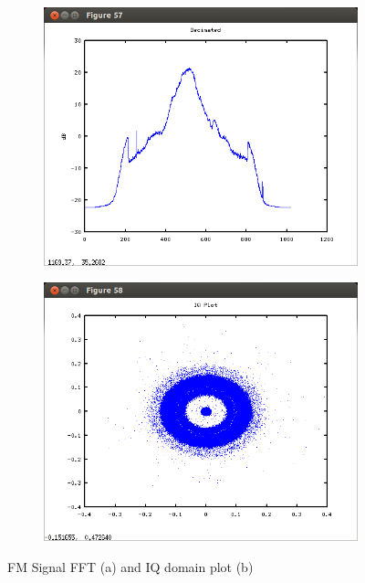 \begin{figure}
\centering
\begin{subfigure}{.49\textwidth}
\centering
\includegraphics[width=\linewidth]{../img/Report_Decimated_FM_Signal.png}
\caption{ }
\end{subfigure}
\begin{subfigure}{.49\textwidth}
\centering
\includegraphics[width=\linewidth]{../img/Report_IQ_FM_Data.png}
\caption{ }
\end{subfigure}
\caption{FM Signal FFT (a) and IQ domain plot (b)}
\label{fig:FMPlots}
\end{figure}

